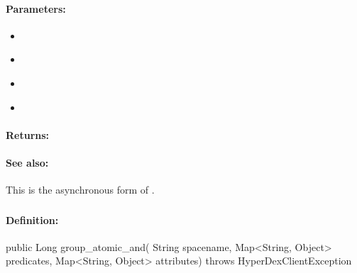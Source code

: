 \paragraph{Parameters:}
\begin{itemize}[noitemsep]
\item {}\\

\item {}\\

\item {}\\

\item {}\\

\end{itemize}

\paragraph{Returns:}


\paragraph{See also:}  This is the asynchronous form of .

\pagebreak
\subsubsection{}
\label{api:java:group_atomic_and}


\paragraph{Definition:}
\begin{javacode}
public Long group_atomic_and(
        String spacename,
        Map<String, Object> predicates,
        Map<String, Object> attributes) throws HyperDexClientException
\end{javacode}

